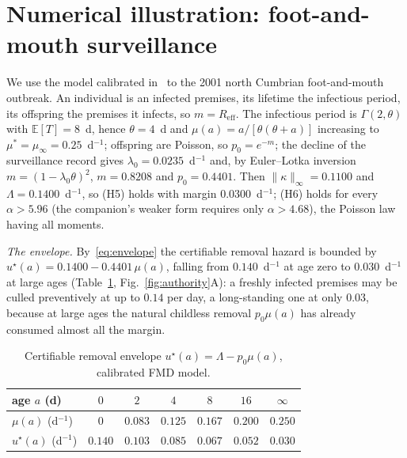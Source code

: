 \documentclass[letterpaper, 10pt, conference]{ieeeconf}
\newcommand{\E}{\mathbb{E}}
\newcommand{\Lbar}{\Lambda}
\newcommand{\edm}[1]{#1}
\begin{document}
\section{Numerical illustration: foot-and-mouth surveillance}
\label{sec:num}
We use the model calibrated in~\cite{companion} to the 2001 north Cumbrian
foot-and-mouth outbreak. An individual is an infected premises, its lifetime the
infectious period, its offspring the premises it infects, so
$m=R_{\mathrm{eff}}$. The infectious period is $\Gamma(2,\theta)$ with
$\E[T]=8$~d, hence $\theta=4$~d and $\mu(a)=a/[\theta(\theta+a)]$ increasing to
$\mu^\ast=\mu_\infty=0.25$~d$^{-1}$; offspring are Poisson, so $p_0=e^{-m}$; the
decline of the surveillance record gives $\lambda_0=0.0235$~d$^{-1}$ and, by
Euler--Lotka inversion $m=(1-\lambda_0\theta)^2$, $m=0.8208$ and $p_0=0.4401$.
Then $\|\kappa\|_\infty=0.1100$ and $\Lbar=0.1400$~d$^{-1}$, so (H5) holds with
margin $0.0300$~d$^{-1}$; (H6) holds for every $\alpha>5.96$ (the companion's
weaker form requires only $\alpha>\edm{4.68}$), the Poisson law having all moments.

\emph{The envelope.} By~\eqref{eq:envelope} the certifiable removal hazard is
bounded by $u^\star(a)=0.1400-0.4401\,\mu(a)$, falling from $0.140$~d$^{-1}$ at
age zero to $0.030$~d$^{-1}$ at large ages (Table~\ref{tab:env},
Fig.~\ref{fig:authority}A): a freshly infected premises may be culled
preventively at up to $0.14$ per day, a long-standing one at only $0.03$, because
at large ages the natural childless removal $p_0\mu(a)$ has already consumed
almost all the margin.
\begin{table}[H]
\centering
\caption{Certifiable removal envelope $u^\star(a)=\Lbar-p_0\mu(a)$, calibrated
FMD model.}
\label{tab:env}
\footnotesize
\setlength{\tabcolsep}{5pt}
\begin{tabular}{@{}|l|c|c|c|c|c|c|@{}}
\hline
age $a$ (d) & $0$ & $2$ & $4$ & $8$ & $16$ & $\infty$ \\ \hline
$\mu(a)$ (d$^{-1}$) & $0$ & $0.083$ & $0.125$ & $0.167$ & $0.200$ & $0.250$\\\hline
$u^\star(a)$ (d$^{-1}$) & $0.140$ & $0.103$ & $0.085$ & $0.067$ & $0.052$ & $0.030$\\
\hline
\end{tabular}
\end{table}
\end{document}
